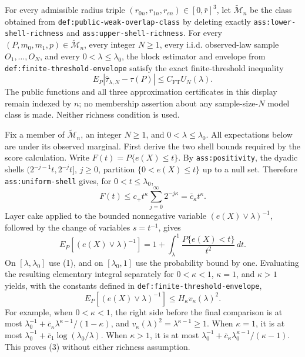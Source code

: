 For every admissible radius triple
\((r_{0n},r_{1n},r_{en})\in[0,\bar r]^3\), let
\(\widetilde{\mathcal M}_n\) be the class obtained from
\texttt{def:public-weak-overlap-class} by deleting exactly
\texttt{ass:lower-shell-richness} and
\texttt{ass:upper-shell-richness}.  For every
\((P,m_0,m_1,p)\in\widetilde{\mathcal M}_n\), every integer \(N\geq1\),
every i.i.d. observed-law sample \(O_1,\ldots,O_N\), and every
\(0<\lambda\leq\lambda_0\), the block estimator and envelope from
\texttt{def:finite-threshold-envelope} satisfy the exact finite-threshold
inequality
\[
E_P\left|\widehat\tau_{\lambda,N}-\tau(P)\right|
\leq C_{\mathrm{FT}}U_N(\lambda).
\]
The public functions and all three approximation certificates in this display
remain indexed by \(n\); no membership assertion about any
sample-size-\(N\) model class is made.  Neither richness condition is used.

Fix a member of \(\widetilde{\mathcal M}_n\), an integer \(N\geq1\), and
\(0<\lambda\leq\lambda_0\).  All expectations below are under its observed
marginal.  First derive the two shell bounds required by the score calculation.
Write \(F(t)=P\{e(X)\leq t\}\).  By \texttt{ass:positivity}, the dyadic
shells \((2^{-j-1}t,2^{-j}t]\), \(j\geq0\), partition
\(\{0<e(X)\leq t\}\) up to a null set.  Therefore
\texttt{ass:uniform-shell} gives, for \(0<t\leq\lambda_0\),
\[
F(t)
\leq c_+t^\kappa\sum_{j=0}^\infty2^{-j\kappa}
=\overline c_\kappa t^\kappa.                                      \tag{1}
\]
Layer cake applied to the bounded nonnegative variable
\((e(X)\vee\lambda)^{-1}\), followed by the change of variables
\(s=t^{-1}\), gives
\[
E_P[(e(X)\vee\lambda)^{-1}]
=1+\int_\lambda^1\frac{P\{e(X)<t\}}{t^2}\,dt.                     \tag{2}
\]
On \([\lambda,\lambda_0]\) use (1), and on
\([\lambda_0,1]\) use the probability bound by one.  Evaluating the
resulting elementary integral separately for \(0<\kappa<1\), \(\kappa=1\),
and \(\kappa>1\) yields, with the constants defined in
\texttt{def:finite-threshold-envelope},
\[
E_P[(e(X)\vee\lambda)^{-1}]
\leq H_\kappa v_\kappa(\lambda)^2.                                  \tag{3}
\]
For example, when \(0<\kappa<1\), the right side before the final comparison
is at most
\(\lambda_0^{-1}+\overline c_\kappa\lambda^{\kappa-1}/(1-\kappa)\),
and \(v_\kappa(\lambda)^2=\lambda^{\kappa-1}\geq1\).  When
\(\kappa=1\), it is at most
\(\lambda_0^{-1}+\overline c_1\log(\lambda_0/\lambda)\).  When
\(\kappa>1\), it is at most
\(\lambda_0^{-1}+\overline c_\kappa\lambda_0^{\kappa-1}/(\kappa-1)\).
This proves (3) without either richness assumption.

